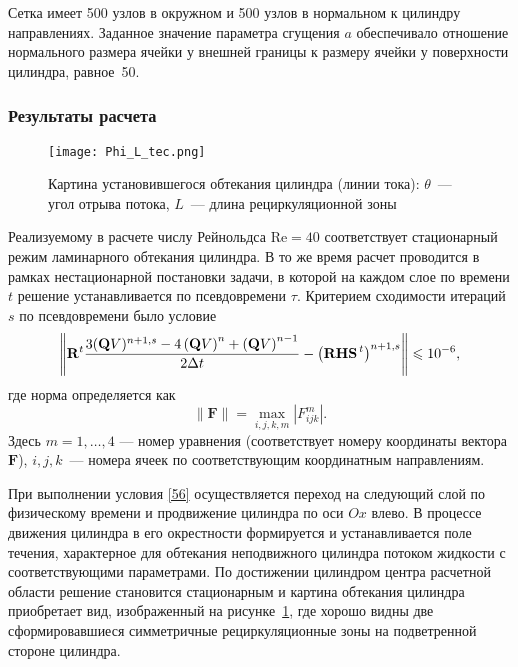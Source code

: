 Сетка имеет 500 узлов в окружном и 500 узлов в нормальном к цилиндру направлениях. Заданное значение 
параметра сгущения $a$ обеспечивало отношение нормального размера ячейки у внешней границы к размеру ячейки у 
поверхности цилиндра, равное~50.

\subsubsection{Результаты расчета}
\label{s:1523}
\begin{figure}[b!]
  \label{fig1:4}
  \centering\texttt{[image: Phi\_L\_tec.png]}  \\
  \caption{Картина установившегося обтекания цилиндра (линии тока): $\theta$~--- угол отрыва потока, 
           $L$~--- длина рециркуляционной зоны}
\end{figure}

Реализуемому в расчете числу Рейнольдса $\mathrm{Re}=40$ соответствует стационарный режим ламинарного 
обтекания цилиндра. В то же время расчет проводится в рамках нестационарной постановки задачи, в которой на 
каждом слое по времени $t$ решение устанавливается по псевдовремени $\tau$. Критерием сходимости
итераций $s$ по псевдовремени было условие
\begin{equation}
  \label{56} 
  \left\| {\bf{R}}^t\frac{3({\bf{Q}}V)^{n + 1, s} - 4\left( {{\bf{Q}}V} \right)^n  + \left( {{\bf{Q}}V} 
  \right)^{n - 1}}{2\Delta t}-\left({\bf{RHS}}^{\,t}\right)^{n+1, s}\right\|
  \leq10^{-6},
\end{equation}
где норма определяется как
\begin{equation*}
  \parallel {\mathbf F}\parallel=\max_{i,j,k,m}|F^m_{ijk}|.
\end{equation*}
Здесь $m=1,\ldots,4$ --- номер уравнения (соответствует номеру координаты вектора $\mathbf F$), $i,j,k$~--- 
номера ячеек по соответствующим координатным направлениям.

При выполнении условия \eqref{56} осуществляется переход на следующий слой по физическому времени и  
продвижение цилиндра по оси $Ox$ влево. В процессе движения цилиндра в его окрестности формируется и 
устанавливается поле течения, характерное для обтекания неподвижного цилиндра потоком жидкости с 
соответствующими параметрами. По достижении цилиндром центра расчетной области решение становится стационарным
и картина обтекания цилиндра приобретает вид, изображенный на рисунке~\ref{fig1:4}, где хорошо видны две 
сформировавшиеся симметричные рециркуляционные зоны на подветренной стороне цилиндра.

